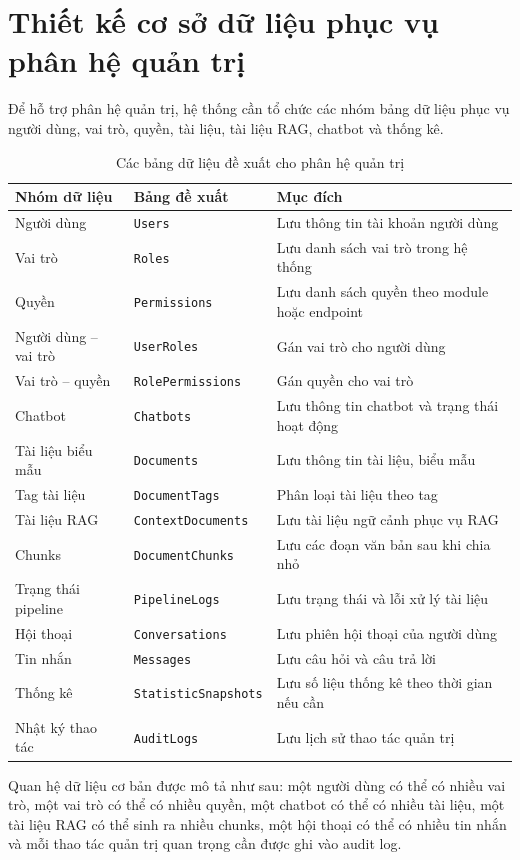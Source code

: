 \section{Thiết kế cơ sở dữ liệu phục vụ phân hệ quản trị}

Để hỗ trợ phân hệ quản trị, hệ thống cần tổ chức các nhóm bảng dữ liệu phục vụ người dùng, vai trò, quyền, tài liệu, tài liệu RAG, chatbot và thống kê.

\begin{table}[H]
\centering
\caption{Các bảng dữ liệu đề xuất cho phân hệ quản trị}
\label{tab:admin-db}
\begin{tabular}{|p{4cm}|p{5cm}|p{6cm}|}
\hline
\textbf{Nhóm dữ liệu} & \textbf{Bảng đề xuất} & \textbf{Mục đích} \\ \hline
Người dùng & \texttt{Users} & Lưu thông tin tài khoản người dùng \\ \hline
Vai trò & \texttt{Roles} & Lưu danh sách vai trò trong hệ thống \\ \hline
Quyền & \texttt{Permissions} & Lưu danh sách quyền theo module hoặc endpoint \\ \hline
Người dùng -- vai trò & \texttt{UserRoles} & Gán vai trò cho người dùng \\ \hline
Vai trò -- quyền & \texttt{RolePermissions} & Gán quyền cho vai trò \\ \hline
Chatbot & \texttt{Chatbots} & Lưu thông tin chatbot và trạng thái hoạt động \\ \hline
Tài liệu biểu mẫu & \texttt{Documents} & Lưu thông tin tài liệu, biểu mẫu \\ \hline
Tag tài liệu & \texttt{DocumentTags} & Phân loại tài liệu theo tag \\ \hline
Tài liệu RAG & \texttt{ContextDocuments} & Lưu tài liệu ngữ cảnh phục vụ RAG \\ \hline
Chunks & \texttt{DocumentChunks} & Lưu các đoạn văn bản sau khi chia nhỏ \\ \hline
Trạng thái pipeline & \texttt{PipelineLogs} & Lưu trạng thái và lỗi xử lý tài liệu \\ \hline
Hội thoại & \texttt{Conversations} & Lưu phiên hội thoại của người dùng \\ \hline
Tin nhắn & \texttt{Messages} & Lưu câu hỏi và câu trả lời \\ \hline
Thống kê & \texttt{StatisticSnapshots} & Lưu số liệu thống kê theo thời gian nếu cần \\ \hline
Nhật ký thao tác & \texttt{AuditLogs} & Lưu lịch sử thao tác quản trị \\ \hline
\end{tabular}
\end{table}

Quan hệ dữ liệu cơ bản được mô tả như sau: một người dùng có thể có nhiều vai trò, một vai trò có thể có nhiều quyền, một chatbot có thể có nhiều tài liệu, một tài liệu RAG có thể sinh ra nhiều chunks, một hội thoại có thể có nhiều tin nhắn và mỗi thao tác quản trị quan trọng cần được ghi vào audit log.
